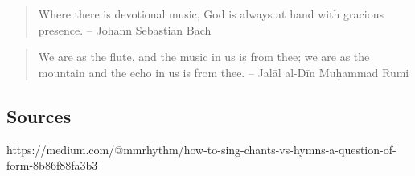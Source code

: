 \documentclass[12pt]{article}
\begin{document}
\begin{quote}
  Where there is devotional music, God is always at hand with gracious presence. – Johann Sebastian Bach
\end{quote}

\begin{quote}
  We are as the flute, and the music in us is from thee; we are as the mountain and the echo in us is from thee. – Jalāl al-Dīn Muḥammad Rumi
\end{quote}




\subsection*{Sources}

https://medium.com/@mmrhythm/how-to-sing-chants-vs-hymns-a-question-of-form-8b86f88fa3b3
\end{document}
